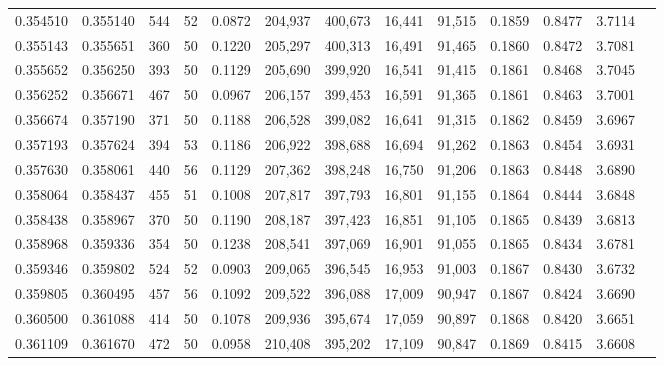 \begin{tabular}{rrrrrrrrrrrrr}
0.354510 & 0.355140 &   544 &  52 &                                     0.0872 & 204,937 & 400,673 &  16,441 &  91,515 & 0.1859 & 0.8477 & 3.7114 \\
0.355143 & 0.355651 &   360 &  50 &                                     0.1220 & 205,297 & 400,313 &  16,491 &  91,465 & 0.1860 & 0.8472 & 3.7081 \\
0.355652 & 0.356250 &   393 &  50 &                                     0.1129 & 205,690 & 399,920 &  16,541 &  91,415 & 0.1861 & 0.8468 & 3.7045 \\
0.356252 & 0.356671 &   467 &  50 &                                     0.0967 & 206,157 & 399,453 &  16,591 &  91,365 & 0.1861 & 0.8463 & 3.7001 \\
0.356674 & 0.357190 &   371 &  50 &                                     0.1188 & 206,528 & 399,082 &  16,641 &  91,315 & 0.1862 & 0.8459 & 3.6967 \\
0.357193 & 0.357624 &   394 &  53 &                                     0.1186 & 206,922 & 398,688 &  16,694 &  91,262 & 0.1863 & 0.8454 & 3.6931 \\
0.357630 & 0.358061 &   440 &  56 &                                     0.1129 & 207,362 & 398,248 &  16,750 &  91,206 & 0.1863 & 0.8448 & 3.6890 \\
0.358064 & 0.358437 &   455 &  51 &                                     0.1008 & 207,817 & 397,793 &  16,801 &  91,155 & 0.1864 & 0.8444 & 3.6848 \\
0.358438 & 0.358967 &   370 &  50 &                                     0.1190 & 208,187 & 397,423 &  16,851 &  91,105 & 0.1865 & 0.8439 & 3.6813 \\
0.358968 & 0.359336 &   354 &  50 &                                     0.1238 & 208,541 & 397,069 &  16,901 &  91,055 & 0.1865 & 0.8434 & 3.6781 \\
0.359346 & 0.359802 &   524 &  52 &                                     0.0903 & 209,065 & 396,545 &  16,953 &  91,003 & 0.1867 & 0.8430 & 3.6732 \\
0.359805 & 0.360495 &   457 &  56 &                                     0.1092 & 209,522 & 396,088 &  17,009 &  90,947 & 0.1867 & 0.8424 & 3.6690 \\
0.360500 & 0.361088 &   414 &  50 &                                     0.1078 & 209,936 & 395,674 &  17,059 &  90,897 & 0.1868 & 0.8420 & 3.6651 \\
0.361109 & 0.361670 &   472 &  50 &                                     0.0958 & 210,408 & 395,202 &  17,109 &  90,847 & 0.1869 & 0.8415 & 3.6608 \\

\end{tabular}
